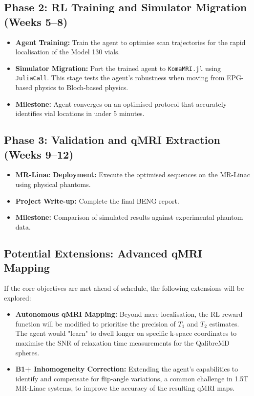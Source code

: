 \subsection{Phase 2: RL Training and Simulator Migration (Weeks 5--8)}
\begin{itemize}
    \item \textbf{Agent Training:} Train the agent to optimise scan trajectories for the rapid localisation of the Model 130 vials. 
    \item \textbf{Simulator Migration:} Port the trained agent to \texttt{KomaMRI.jl} using \texttt{JuliaCall}. This stage tests the agent's robustness when moving from EPG-based physics to Bloch-based physics.
    \item \textbf{Milestone:} Agent converges on an optimised protocol that accurately identifies vial locations in under 5 minutes.
\end{itemize}

\subsection{Phase 3: Validation and qMRI Extraction (Weeks 9--12)}
\begin{itemize}
    \item \textbf{MR-Linac Deployment:} Execute the optimised sequences on the MR-Linac using physical phantoms. 
    \item \textbf{Project Write-up:} Complete the final BENG report.
    \item \textbf{Milestone:} Comparison of simulated results against experimental phantom data.
\end{itemize}

\subsection{Potential Extensions: Advanced qMRI Mapping}
If the core objectives are met ahead of schedule, the following extensions will be explored:
\begin{itemize}
    \item \textbf{Autonomous qMRI Mapping:} Beyond mere localisation, the RL reward function will be modified to prioritise the precision of $T_1$ and $T_2$ estimates. The agent would "learn" to dwell longer on specific k-space coordinates to maximise the SNR of relaxation time measurements for the QalibreMD spheres.
    \item \textbf{B1+ Inhomogeneity Correction:} Extending the agent’s capabilities to identify and compensate for flip-angle variations, a common challenge in 1.5T MR-Linac systems, to improve the accuracy of the resulting qMRI maps.
\end{itemize}

